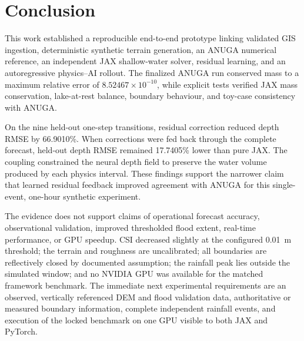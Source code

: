 \section{Conclusion}
\label{sec:conclusion}

This work established a reproducible end-to-end prototype linking validated
GIS ingestion, deterministic synthetic terrain generation, an ANUGA numerical
reference, an independent JAX shallow-water solver, residual learning, and an
autoregressive physics--AI rollout.  The finalized ANUGA run conserved mass to
a maximum relative error of \(8.52467\times10^{-10}\), while explicit tests
verified JAX mass conservation, lake-at-rest balance, boundary behaviour, and
toy-case consistency with ANUGA.

On the nine held-out one-step transitions, residual correction reduced depth
RMSE by 66.9010\%.  When corrections were fed back through the complete
forecast, held-out depth RMSE remained 17.7405\% lower than pure JAX.  The
coupling constrained the neural depth field to preserve the water volume
produced by each physics interval.  These findings support the narrower claim
that learned residual feedback improved agreement with ANUGA for this
single-event, one-hour synthetic experiment.

The evidence does not support claims of operational forecast accuracy,
observational validation, improved thresholded flood extent, real-time
performance, or GPU speedup.  CSI decreased slightly at the configured
0.01~m threshold; the terrain and roughness are uncalibrated; all boundaries
are reflectively closed by documented assumption; the rainfall peak lies
outside the simulated window; and no NVIDIA GPU was available for the matched
framework benchmark.  The immediate next experimental requirements are an
observed, vertically referenced DEM and flood validation data, authoritative
or measured boundary information, complete independent rainfall events, and
execution of the locked benchmark on one GPU visible to both JAX and PyTorch.
